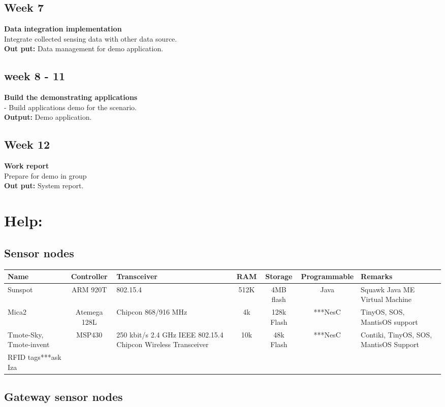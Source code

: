 \documentclass[a4paper]{llncs}
\newcommand{\head}[1]{\textnormal {\textbf{#1}}}
\begin{document}
\subsection{Week 7}
\head{Data integration implementation}\\
Integrate collected sensing data with other data source.\\
\head{Out put: } Data management for demo application.
\subsection{week 8 - 11}
\head{Build the demonstrating applications}\\
- Build applications demo for the scenario.\\
\head{Output: }  Demo application.
\subsection{Week 12}
\head{Work report}\\
Prepare for demo in group\\
\head{Out put: } System report.

\section{Help:}

\subsection{Sensor nodes}
\begin{tabular}{|p{2.5cm}|c|p{2cm}|c|c|c|p{2.5cm}|}
\hline
\head{Name} & \head{Controller} & \head{Transceiver} & \head{RAM} & \head{Storage} &\head{Programmable} &\head{Remarks}\\
\hline
{Sunspot} & {ARM 920T} & {802.15.4} & {512K} & {4MB flash} & {Java } & {Squawk Java ME Virtual Machine} \\
\hline
{Mica2} & {Atemega 128L} & {Chipcon 868/916 MHz}& {4k} & {128k Flash} & {***NesC} & {TinyOS, SOS, MantisOS support} \\
\hline
{Tmote-Sky, Tmote-invent} & {MSP430} & {250 kbit/s 2.4 GHz IEEE 802.15.4 Chipcon Wireless Transceiver} & {10k} & {48k Flash} & {***NesC} & {Contiki, TinyOS, SOS, MantisOS Support}\\
\hline
{RFID tags***ask Iza} &{}&{}&{}&{}&{}&{}\\
\hline
\end{tabular}

\subsection{Gateway sensor nodes}
\end{document}

